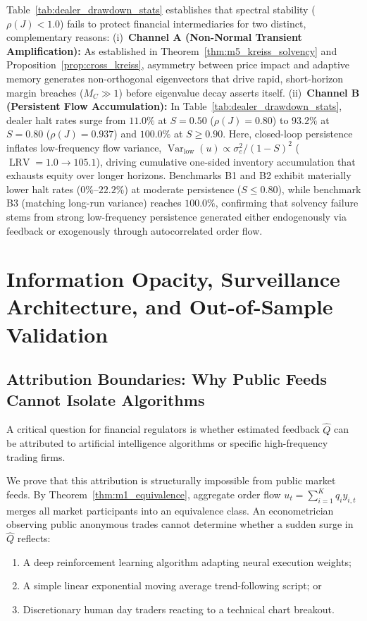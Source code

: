 \documentclass[12pt]{article}
\theoremstyle{definition}
\theoremstyle{remark}
\begin{document}
Table~\ref{tab:dealer_drawdown_stats} establishes that spectral stability ($\rho(J) < 1.0$) fails to protect financial intermediaries for two distinct, complementary reasons:
(i)~\textbf{Channel A (Non-Normal Transient Amplification):} As established in Theorem~\ref{thm:m5_kreiss_solvency} and Proposition~\ref{prop:cross_kreiss}, asymmetry between price impact and adaptive memory generates non-orthogonal eigenvectors that drive rapid, short-horizon margin breaches ($M_C \gg 1$) before eigenvalue decay asserts itself.
(ii)~\textbf{Channel B (Persistent Flow Accumulation):} In Table~\ref{tab:dealer_drawdown_stats}, dealer halt rates surge from $11.0\%$ at $S=0.50$ ($\rho(J) = 0.80$) to $93.2\%$ at $S=0.80$ ($\rho(J) = 0.937$) and $100.0\%$ at $S \ge 0.90$. Here, closed-loop persistence inflates low-frequency flow variance, $\operatorname{Var}_{\text{low}}(u) \propto \sigma_e^2 / (1 - S)^2$ ($\operatorname{LRV} = 1.0 \to 105.1$), driving cumulative one-sided inventory accumulation that exhausts equity over longer horizons. Benchmarks B1 and B2 exhibit materially lower halt rates ($0\%$--$22.2\%$) at moderate persistence ($S \le 0.80$), while benchmark B3 (matching long-run variance) reaches $100.0\%$, confirming that solvency failure stems from strong low-frequency persistence generated either endogenously via feedback or exogenously through autocorrelated order flow.

\section{Information Opacity, Surveillance Architecture, and Out-of-Sample Validation}
\label{sec:attribution_falsification}

\subsection{Attribution Boundaries: Why Public Feeds Cannot Isolate Algorithms}
A critical question for financial regulators is whether estimated feedback $\hat{Q}$ can be attributed to artificial intelligence algorithms or specific high-frequency trading firms.

We prove that this attribution is structurally impossible from public market feeds. By Theorem~\ref{thm:m1_equivalence}, aggregate order flow $u_t = \sum_{i=1}^K q_i y_{i,t}$ merges all market participants into an equivalence class. An econometrician observing public anonymous trades cannot determine whether a sudden surge in $\hat{Q}$ reflects:
\begin{enumerate}[noitemsep,topsep=1pt]
    \item A deep reinforcement learning algorithm adapting neural execution weights;
    \item A simple linear exponential moving average trend-following script; or
    \item Discretionary human day traders reacting to a technical chart breakout.
\end{enumerate}
\end{document}
